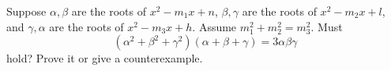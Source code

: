 Suppose $\alpha,\beta$ are the roots of $x^2-m_1x+n$, $\beta,\gamma$ are the roots of $x^2-m_2x+l$, and $\gamma,\alpha$ are the roots of $x^2-m_3x+h$. Assume $m_1^2+m_2^2=m_3^2$. Must
\[(\alpha^2+\beta^2+\gamma^2)(\alpha+\beta+\gamma)=3\alpha\beta\gamma\]
hold? Prove it or give a counterexample.
